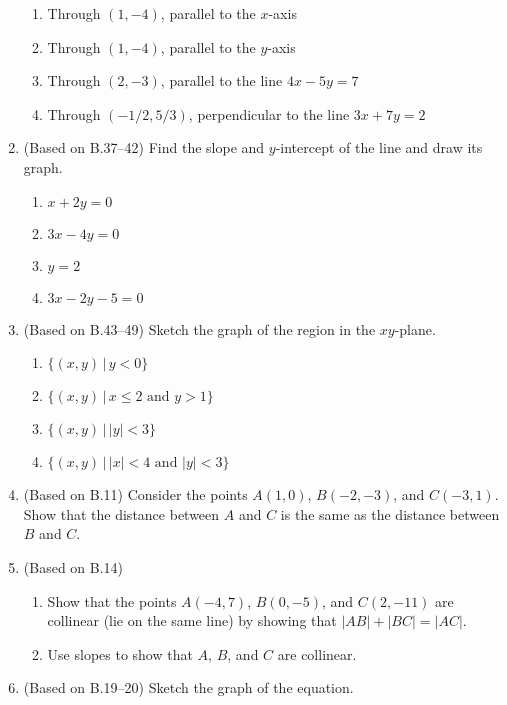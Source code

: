 \documentclass[11pt]{article}
\newcommand{\ds}{\displaystyle}
\begin{document}
\begin{enumerate}
\begin{enumerate}
  \item Through $(1,-4)$, parallel to the $x$-axis
  \item Through $(1,-4)$, parallel to the $y$-axis
  \item Through $(2,-3)$, parallel to the line $4x-5y=7$
  \item Through $(-1/2,5/3)$, perpendicular to the line $3x+7y=2$
  \end{enumerate}
\item (Based on B.37--42) Find the slope and $y$-intercept of the line
  and draw its graph.
  \begin{multicols}{4}
  \begin{enumerate}
  \item $\ds x+2y=0$
  \item $\ds 3x-4y=0$
  \item $\ds y=2$
  \item $\ds 3x-2y-5=0$
  \end{enumerate}
  \end{multicols}
\item (Based on B.43--49) Sketch the graph of the region in the $xy$-plane.
  \begin{multicols}{2}
  \begin{enumerate}
  \item $\ds \{(x,y) \, | \, y<0\}$
  \item $\ds \{(x,y) \, | \, \mbox{$x\le 2$ and $y>1$}\}$
  \item $\ds \{(x,y) \, | \, |y|<3\}$
  \item $\ds \{(x,y) \, | \, \mbox{$|x|<4$ and $|y|<3$}\}$
  \end{enumerate}
  \end{multicols}
\item (Based on B.11) Consider the points $A(1,0)$, $B(-2,-3)$, and $C(-3,1)$.
  Show that the distance between $A$ and $C$ is the same as the distance
  between $B$ and $C$.
\item (Based on B.14) 
  \begin{enumerate}
  \item Show that the points $A(-4,7)$, $B(0,-5)$, and $C(2,-11)$ are collinear
    (lie on the same line) by showing that $|AB|+|BC|=|AC|$.
  \item Use slopes to show that $A$, $B$, and $C$ are collinear.
  \end{enumerate}
\item (Based on B.19--20) Sketch the graph of the equation.
  \begin{multicols}{2}

\end{multicols}
\end{enumerate}
\end{document}
